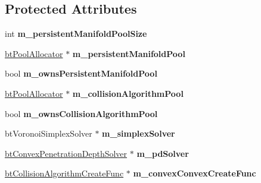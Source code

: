 \subsection*{Protected Attributes}
\begin{DoxyCompactItemize}
\item 
\mbox{\label{classbtDefaultCollisionConfiguration_ac647b997211ced385240ec57bd330546}} 
int {\bfseries m\+\_\+persistent\+Manifold\+Pool\+Size}
\item 
\mbox{\label{classbtDefaultCollisionConfiguration_a435da1d12c05acf9eba4b3a7ec74664f}} 
\hyperlink{classbtPoolAllocator}{bt\+Pool\+Allocator} $\ast$ {\bfseries m\+\_\+persistent\+Manifold\+Pool}
\item 
\mbox{\label{classbtDefaultCollisionConfiguration_a850a9dbff2bcee2af5ed8007a71282a6}} 
bool {\bfseries m\+\_\+owns\+Persistent\+Manifold\+Pool}
\item 
\mbox{\label{classbtDefaultCollisionConfiguration_a6be584c834656dca183a2f89277f4e02}} 
\hyperlink{classbtPoolAllocator}{bt\+Pool\+Allocator} $\ast$ {\bfseries m\+\_\+collision\+Algorithm\+Pool}
\item 
\mbox{\label{classbtDefaultCollisionConfiguration_affc8aa63ac892dca9eea402742bbb107}} 
bool {\bfseries m\+\_\+owns\+Collision\+Algorithm\+Pool}
\item 
\mbox{\label{classbtDefaultCollisionConfiguration_ad4ed53d963c2db2188fcbc771a7ccd6e}} 
bt\+Voronoi\+Simplex\+Solver $\ast$ {\bfseries m\+\_\+simplex\+Solver}
\item 
\mbox{\label{classbtDefaultCollisionConfiguration_a7e73a15f38bab1620845cac6936e21b3}} 
\hyperlink{classbtConvexPenetrationDepthSolver}{bt\+Convex\+Penetration\+Depth\+Solver} $\ast$ {\bfseries m\+\_\+pd\+Solver}
\item 
\mbox{\label{classbtDefaultCollisionConfiguration_ac83526a2e1549920971775f3d9ed6b5a}} 
\hyperlink{structbtCollisionAlgorithmCreateFunc}{bt\+Collision\+Algorithm\+Create\+Func} $\ast$ {\bfseries m\+\_\+convex\+Convex\+Create\+Func}

\end{DoxyCompactItemize}
